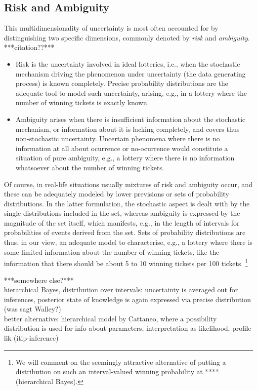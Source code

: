 \subsection{Risk and Ambiguity}
\label{sec:motivation-riskambiguity}

This multidimensionality of uncertainty is most often accounted for
by distinguishing two specific dimensions,
commonly denoted by \emph{risk} and \emph{ambiguity}. ***citation??***
\begin{itemize}
\item Risk is the uncertainty involved in ideal lotteries,
i.e., when the stochastic mechanism driving the phenomenon under uncertainty
(the data generating process) is known completely.
Precise probability distributions are the adequate tool to model such uncertainty,
arising, e.g., in a lottery where the number of winning tickets is exactly known.
\item Ambiguity arises when there is insufficient information about the stochastic mechanism,
or information about it is lacking completely, and covers thus non-stochastic uncertainty.
Uncertain phenomena where there is no information at all
about ocurrence or no-ocurrence would constitute a situation of pure ambiguity,
e.g., a lottery where there is no information whatsoever about the number of winning tickets.
\end{itemize}

Of course, in real-life situations usually mixtures of risk and ambiguity occur,
and these can be adequately modeled by lower previsions or sets of probability distributions.
In the latter formulation,
the stochastic aspect is dealt with by the single distributions included in the set,
whereas ambiguity is expressed by the magnitude of the set itself,
which manifests, e.g., in the length of intervals for probabilities of events derived from the set.
Sets of probability distributions are thus, in our view,
an adequate model to characterise, e.g.,
a lottery where there is some limited information about the number of winning tickets,
like the information that there should be about 5 to 10 winning tickets per 100 tickets.%
\footnote{We will comment on the seemingly attractive alternative
of putting a distribution on such an interval-valued winning probability at **** (hierarchical Bayes).}

***somewhere else?***\\
hierarchical Bayes, distribution over intervals:
uncertainty is averaged out for inferences,
posterior state of knowledge is again expressed via precise distribution (was sagt Walley?)\\
better alternative: hierarchical model by Cattaneo,
where a possibility distribution is used for info about parameters,
interpretation as likelihood, profile lik (itip-inference)


